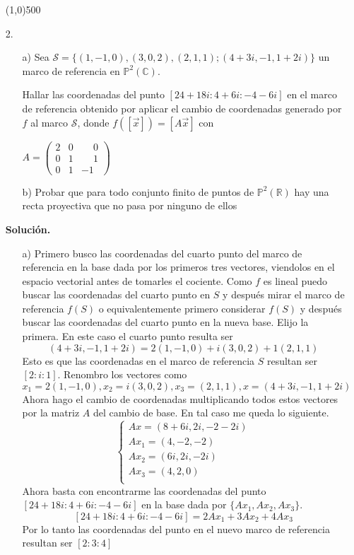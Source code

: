 \documentclass{article}
\begin{document}
\begin{itemize}
	\line(1,0){500}
	
	\item[2.] \begin{itemize}
		\item [a)] Sea $\mathcal{S}=\{(1,-1,0), (3,0,2), (2,1,1);(4+3i,-1,1+2i)\}$ un marco de referencia en $\mathbb{P}^2(\mathbb{C})$.
		
		Hallar las coordenadas del punto $[24+18i:4+6i:-4-6i]$ en el marco de referencia obtenido por aplicar el cambio de coordenadas generado por $f$ al marco $\mathcal{S}$, donde $f([\vec{x}])=[A\vec{x}]$ con 
		
		$A=\begin{pmatrix}
		2&0&\phantom{-}0 \\ 0&1&\phantom{-}1 \\ 0&1&-1
		\end{pmatrix}$
		
		
		
		
		\item[b)]Probar que para todo conjunto finito de puntos de $\mathbb{P}^2(\mathbb{R})$ hay una recta proyectiva que no pasa por ninguno de ellos 
	\end{itemize}

\textbf{Solución.}
\begin{itemize}
	\item[a)] 
	 Primero busco las coordenadas del cuarto punto del marco de referencia en la base dada por los primeros tres vectores, viendolos en el espacio vectorial antes de tomarles el cociente.  Como $f$ es lineal puedo buscar las coordenadas del cuarto punto en $S$ y después mirar el marco de referencia $f(S)$ o equivalentemente primero considerar $f(S)$ y después buscar las coordenadas del cuarto punto en la nueva base. Elijo la primera.  En este caso el cuarto punto resulta ser
	\[(4+3i,-1,1+2i) = 2(1,-1,0) +i(3,0,2) +1(2,1,1) \]
	Esto es que las coordenadas en el marco de referencia $S$ resultan ser $[2:i:1]$.
	Renombro los vectores como $x_1=2(1,-1,0) ,x_2=i(3,0,2) ,x_3=(2,1,1), x= (4+3i,-1,1+2i)$ 
	Ahora hago el cambio de coordenadas  multiplicando todos estos vectores por la matriz $A$ del cambio de base. En tal caso me queda lo siguiente. 
	\begin{equation*}
	\begin{cases} 
		Ax =(8+6i,2i,-2-2i) \\
		Ax_1 = (4,-2,-2) \\
	Ax_2 = (6i,2i,-2i) \\
		Ax_3 = (4,2,0) \\		
	\end{cases}  
	\end{equation*}
	Ahora basta con encontrarme las coordenadas del punto $[24+18i:4+6i:-4-6i]$ en la base dada por $\{Ax_1,Ax_2,Ax_3\}$.
	\[ [24+18i:4+6i:-4-6i] = 2Ax_1 + 3Ax_2 +4Ax_3 \]	
	Por lo tanto las coordenadas del punto en el nuevo marco de referencia resultan ser $[2:3:4]$
	

\end{itemize}
\end{itemize}
\end{document}
